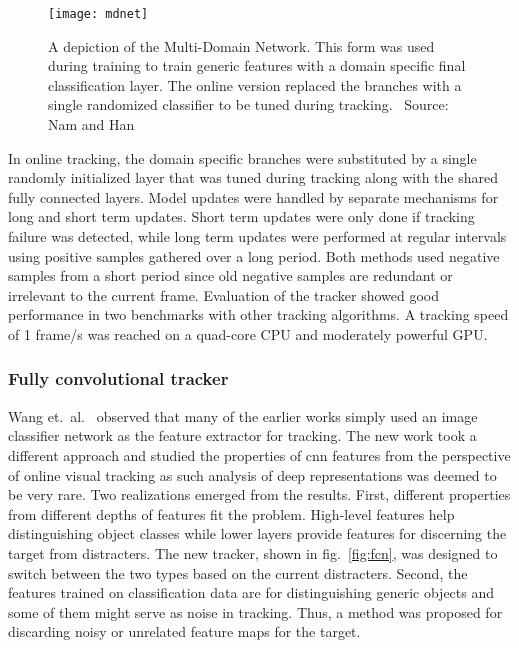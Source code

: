 \begin{figure}[H]
\centering
\texttt{[image: mdnet]}
\caption{A depiction of the Multi-Domain Network. This form was used during training to train generic features with a domain specific final classification layer. The online version replaced the branches with a single randomized classifier to be tuned during tracking.~\cite{MDNET} Source: Nam and Han~\cite{MDNET}}\label{fig:mdnet}
\end{figure}

In online tracking, the domain specific branches were substituted by a single randomly initialized layer that was tuned during tracking along with the shared fully connected layers. Model updates were handled by separate mechanisms for long and short term updates. Short term updates were only done if tracking failure was detected, while long term updates were performed at regular intervals using positive samples gathered over a long period. Both methods used negative samples from a short period since old negative samples are redundant or irrelevant to the current frame. Evaluation of the tracker showed good performance in two benchmarks with other tracking algorithms. A tracking speed of 1 frame/s was reached on a quad-core CPU and moderately powerful GPU.~\cite{MDNET}

\subsubsection{Fully convolutional tracker}\label{sssec:fcn}
Wang et.~al.~\cite{FCN_TRACK_2} observed that many of the earlier works simply used an image classifier network as the feature extractor for tracking. The new work took a different approach and studied the properties of \ac{cnn} features from the perspective of online visual tracking as such analysis of deep representations was deemed to be very rare. Two realizations emerged from the results. First, different properties from different depths of features fit the problem. High-level features help distinguishing object classes while lower layers provide features for discerning the target from distracters. The new tracker, shown in fig.~\ref{fig:fcn}, was designed to switch between the two types based on the current distracters. Second, the features trained on classification data are for distinguishing generic objects and some of them might serve as noise in tracking. Thus, a method was proposed for discarding noisy or unrelated feature maps for the target.~\cite{FCN_TRACK_2}

